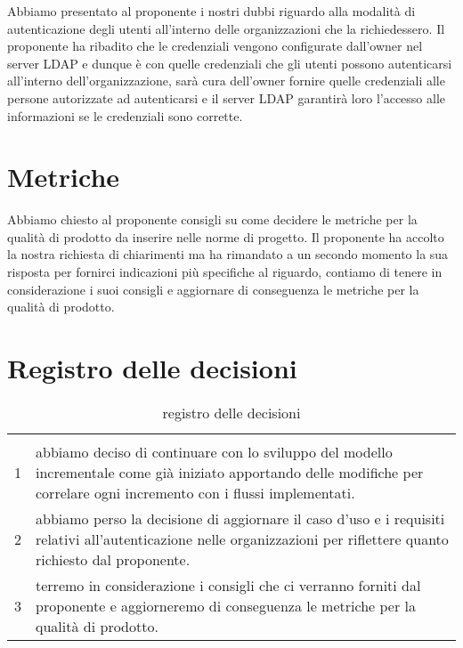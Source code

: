 \documentclass{article}
\begin{document}
Abbiamo presentato al proponente i nostri dubbi riguardo alla modalità di autenticazione degli utenti all'interno delle organizzazioni che la richiedessero. Il proponente ha ribadito che le credenziali vengono configurate dall'owner nel server LDAP e dunque è con quelle credenziali che gli utenti possono autenticarsi all'interno dell'organizzazione, sarà cura dell'owner fornire quelle credenziali alle persone autorizzate ad autenticarsi e il server LDAP garantirà loro l'accesso alle informazioni se le credenziali sono corrette.

\section{Metriche}%
\label{sec:metriche}

Abbiamo chiesto al proponente consigli su come decidere le metriche per la qualità di prodotto da inserire nelle norme di progetto. Il proponente ha accolto la nostra richiesta di chiarimenti ma ha rimandato a un secondo momento la sua risposta per fornirci indicazioni più specifiche al riguardo, contiamo di tenere in considerazione i suoi consigli e aggiornare di conseguenza le metriche per la qualità di prodotto.

\newpage
\section{Registro delle decisioni}%
\label{sec:registro_delle_decisioni}
\begin{table}[H]
  \centering
  \renewcommand{\arraystretch}{2}
  \begin{tabular}{c b{13cm}}
    \rowcolor{darkgray!90!}\color{white}{\textbf{Codice}} & \color{white}{\textbf{Decisione}}\\
    1 & abbiamo deciso di continuare con lo sviluppo del modello incrementale come già iniziato apportando delle modifiche per correlare ogni incremento con i flussi implementati. \\
    2 & abbiamo perso la decisione di aggiornare il caso d'uso e i requisiti relativi all'autenticazione nelle organizzazioni per riflettere quanto richiesto dal proponente.\\
    3 & terremo in considerazione i consigli che ci verranno forniti dal proponente e aggiorneremo di conseguenza le metriche per la qualità di prodotto. \\

  \end{tabular}
  \caption{registro delle decisioni}%
  \label{tab:registro delle decisioni}
  \end{table}
\end{document}
